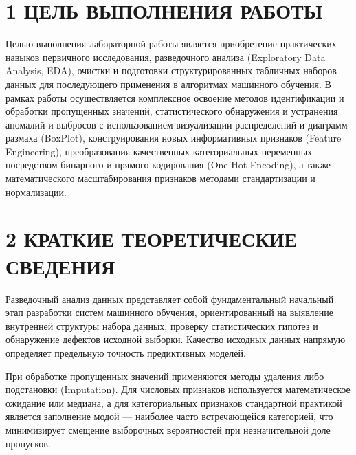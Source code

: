 \documentclass[14pt,a4paper]{extarticle}
\begin{document}
\setcounter{page}{2}

\section*{1 ЦЕЛЬ ВЫПОЛНЕНИЯ РАБОТЫ}

Целью выполнения лабораторной работы является приобретение практических навыков первичного исследования, разведочного анализа (Exploratory Data Analysis, EDA), очистки и подготовки структурированных табличных наборов данных для последующего применения в алгоритмах машинного обучения. В рамках работы осуществляется комплексное освоение методов идентификации и обработки пропущенных значений, статистического обнаружения и устранения аномалий и выбросов с использованием визуализации распределений и диаграмм размаха (BoxPlot), конструирования новых информативных признаков (Feature Engineering), преобразования качественных категориальных переменных посредством бинарного и прямого кодирования (One-Hot Encoding), а также математического масштабирования признаков методами стандартизации и нормализации.

\section*{2 КРАТКИЕ ТЕОРЕТИЧЕСКИЕ СВЕДЕНИЯ}

Разведочный анализ данных представляет собой фундаментальный начальный этап разработки систем машинного обучения, ориентированный на выявление внутренней структуры набора данных, проверку статистических гипотез и обнаружение дефектов исходной выборки. Качество исходных данных напрямую определяет предельную точность предиктивных моделей.

При обработке пропущенных значений применяются методы удаления либо подстановки (Imputation). Для числовых признаков используется математическое ожидание или медиана, а для категориальных признаков стандартной практикой является заполнение модой --- наиболее часто встречающейся категорией, что минимизирует смещение выборочных вероятностей при незначительной доле пропусков.
\end{document}
